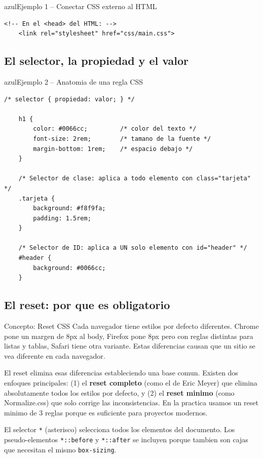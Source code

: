 \documentclass[11pt,a4paper]{article}
\begin{document}
	\begin{cajacodigo}{azul}{Ejemplo 1 -- Conectar CSS externo al HTML}
		\begin{lstlisting}[style=codehtml]
	<!-- En el <head> del HTML: -->
	<link rel="stylesheet" href="css/main.css">
		\end{lstlisting}
	\end{cajacodigo}
	
	\subsection{El selector, la propiedad y el valor}
	
	\begin{cajacodigo}{azul}{Ejemplo 2 -- Anatomia de una regla CSS}
		\begin{lstlisting}[style=codecss]
	/* selector { propiedad: valor; } */
	
	h1 {
		color: #0066cc;         /* color del texto */
		font-size: 2rem;        /* tamano de la fuente */
		margin-bottom: 1rem;    /* espacio debajo */
	}
	
	/* Selector de clase: aplica a todo elemento con class="tarjeta" */
	.tarjeta {
		background: #f8f9fa;
		padding: 1.5rem;
	}
	
	/* Selector de ID: aplica a UN solo elemento con id="header" */
	#header {
		background: #0066cc;
	} \end{lstlisting}
	\end{cajacodigo}
	
	\subsection{El reset: por que es obligatorio}
	
	\begin{cajaconcepto}{Concepto: Reset CSS}
		Cada navegador tiene estilos por defecto diferentes. Chrome pone un margen de 8px al body, Firefox pone 8px pero con reglas distintas para listas y tablas, Safari tiene otra variante. Estas diferencias causan que un sitio se vea diferente en cada navegador.
		
		El reset elimina esas diferencias estableciendo una base comun. Existen dos enfoques principales: (1) el \textbf{reset completo} (como el de Eric Meyer) que elimina absolutamente todos los estilos por defecto, y (2) el \textbf{reset minimo} (como Normalize.css) que solo corrige las inconsistencias. En la practica usamos un reset minimo de 3 reglas porque es suficiente para proyectos modernos.
		
		El selector \texttt{*} (asterisco) selecciona todos los elementos del documento. Los pseudo-elementos \texttt{*::before} y \texttt{*::after} se incluyen porque tambien son cajas que necesitan el mismo \texttt{box-sizing}.
	\end{cajaconcepto}
	
\end{document}
